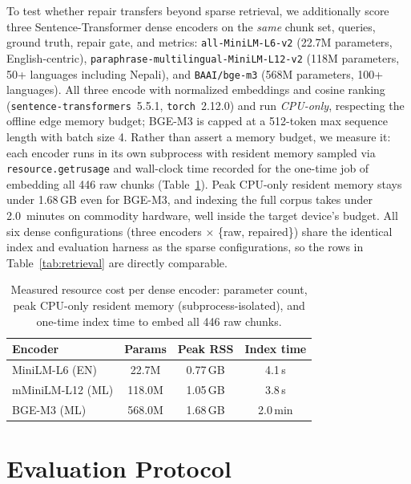 \documentclass[journal]{IEEEtran}
\newcommand{\corpusChunks}{446}
\newcommand{\densePeakRSS}{1.68}
\newcommand{\enPeakRSS}{0.77}
\newcommand{\enIndexTime}{4.1}
\newcommand{\mlPeakRSS}{1.05}
\newcommand{\mlIndexTime}{3.8}
\newcommand{\bgeIndexTime}{2.0}
\begin{document}
To test whether repair transfers beyond sparse retrieval, we additionally score three Sentence-Transformer dense encoders on the \emph{same} chunk set, queries, ground truth, repair gate, and metrics: \texttt{all-MiniLM-L6-v2} (22.7M parameters, English-centric), \texttt{paraphrase-multilingual-MiniLM-L12-v2} (118M parameters, 50+ languages including Nepali), and \texttt{BAAI/bge-m3} (568M parameters, 100+ languages). All three encode with normalized embeddings and cosine ranking (\texttt{sentence-transformers}~5.5.1, \texttt{torch}~2.12.0) and run \emph{CPU-only}, respecting the offline edge memory budget; BGE-M3 is capped at a 512-token max sequence length with batch size 4. Rather than assert a memory budget, we measure it: each encoder runs in its own subprocess with resident memory sampled via \texttt{resource.getrusage} and wall-clock time recorded for the one-time job of embedding all \corpusChunks{} raw chunks (Table~\ref{tab:resource}). Peak CPU-only resident memory stays under \densePeakRSS{}\,GB even for BGE-M3, and indexing the full corpus takes under \bgeIndexTime{}~minutes on commodity hardware, well inside the target device's budget. All six dense configurations (three encoders $\times$ \{raw, repaired\}) share the identical index and evaluation harness as the sparse configurations, so the rows in Table~\ref{tab:retrieval} are directly comparable.

\begin{table}[t]
\caption{Measured resource cost per dense encoder: parameter count, peak CPU-only resident memory (subprocess-isolated), and one-time index time to embed all \corpusChunks{} raw chunks.}
\label{tab:resource}
\centering
\begin{tabular}{lccc}
\toprule
\textbf{Encoder} & \textbf{Params} & \textbf{Peak RSS} & \textbf{Index time} \\
\midrule
MiniLM-L6 (EN) & 22.7M & \enPeakRSS{}\,GB & \enIndexTime{}\,s \\
mMiniLM-L12 (ML) & 118.0M & \mlPeakRSS{}\,GB & \mlIndexTime{}\,s \\
BGE-M3 (ML) & 568.0M & \densePeakRSS{}\,GB & \bgeIndexTime{}\,min \\
\bottomrule
\end{tabular}
\end{table}

\section{Evaluation Protocol}
\end{document}
